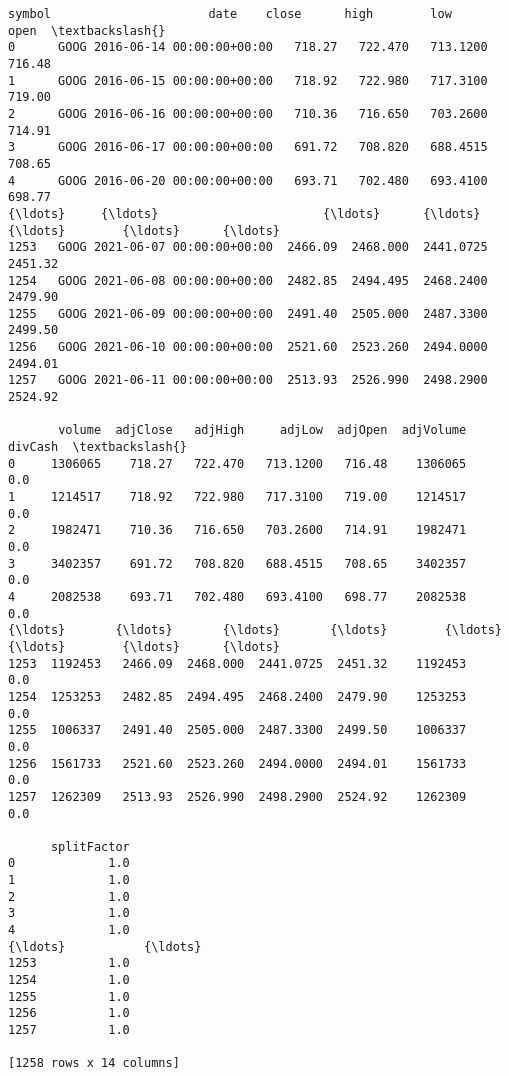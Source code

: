 \documentclass[11pt]{article}
\makeatletter
\newcommand{\boxspacing}{\kern\kvtcb@left@rule\kern\kvtcb@boxsep}
\newcommand{\prompt}[4]{
        {\ttfamily\llap{{\color{#2}[#3]:\hspace{3pt}#4}}\vspace{-\baselineskip}}
    }
\makeatother
\begin{document}
            \begin{tcolorbox}[breakable, size=fbox, boxrule=.5pt, pad at break*=1mm, opacityfill=0]
\prompt{Out}{outcolor}{68}{\boxspacing}
\begin{Verbatim}[commandchars=\\\{\}]
     symbol                      date    close      high        low     open  \textbackslash{}
0      GOOG 2016-06-14 00:00:00+00:00   718.27   722.470   713.1200   716.48
1      GOOG 2016-06-15 00:00:00+00:00   718.92   722.980   717.3100   719.00
2      GOOG 2016-06-16 00:00:00+00:00   710.36   716.650   703.2600   714.91
3      GOOG 2016-06-17 00:00:00+00:00   691.72   708.820   688.4515   708.65
4      GOOG 2016-06-20 00:00:00+00:00   693.71   702.480   693.4100   698.77
{\ldots}     {\ldots}                       {\ldots}      {\ldots}       {\ldots}        {\ldots}      {\ldots}
1253   GOOG 2021-06-07 00:00:00+00:00  2466.09  2468.000  2441.0725  2451.32
1254   GOOG 2021-06-08 00:00:00+00:00  2482.85  2494.495  2468.2400  2479.90
1255   GOOG 2021-06-09 00:00:00+00:00  2491.40  2505.000  2487.3300  2499.50
1256   GOOG 2021-06-10 00:00:00+00:00  2521.60  2523.260  2494.0000  2494.01
1257   GOOG 2021-06-11 00:00:00+00:00  2513.93  2526.990  2498.2900  2524.92

       volume  adjClose   adjHigh     adjLow  adjOpen  adjVolume  divCash  \textbackslash{}
0     1306065    718.27   722.470   713.1200   716.48    1306065      0.0
1     1214517    718.92   722.980   717.3100   719.00    1214517      0.0
2     1982471    710.36   716.650   703.2600   714.91    1982471      0.0
3     3402357    691.72   708.820   688.4515   708.65    3402357      0.0
4     2082538    693.71   702.480   693.4100   698.77    2082538      0.0
{\ldots}       {\ldots}       {\ldots}       {\ldots}        {\ldots}      {\ldots}        {\ldots}      {\ldots}
1253  1192453   2466.09  2468.000  2441.0725  2451.32    1192453      0.0
1254  1253253   2482.85  2494.495  2468.2400  2479.90    1253253      0.0
1255  1006337   2491.40  2505.000  2487.3300  2499.50    1006337      0.0
1256  1561733   2521.60  2523.260  2494.0000  2494.01    1561733      0.0
1257  1262309   2513.93  2526.990  2498.2900  2524.92    1262309      0.0

      splitFactor
0             1.0
1             1.0
2             1.0
3             1.0
4             1.0
{\ldots}           {\ldots}
1253          1.0
1254          1.0
1255          1.0
1256          1.0
1257          1.0

[1258 rows x 14 columns]
\end{Verbatim}
\end{tcolorbox}
        
\end{document}
